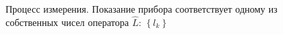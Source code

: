 \begin{figure}
\centering



\caption{Процесс измерения. Показание прибора соответствует одному из
  собственных чисел оператора  $\hat{L}$: $\left\{l_k\right\}$}
\label{figAddMeasur}
\end{figure}
